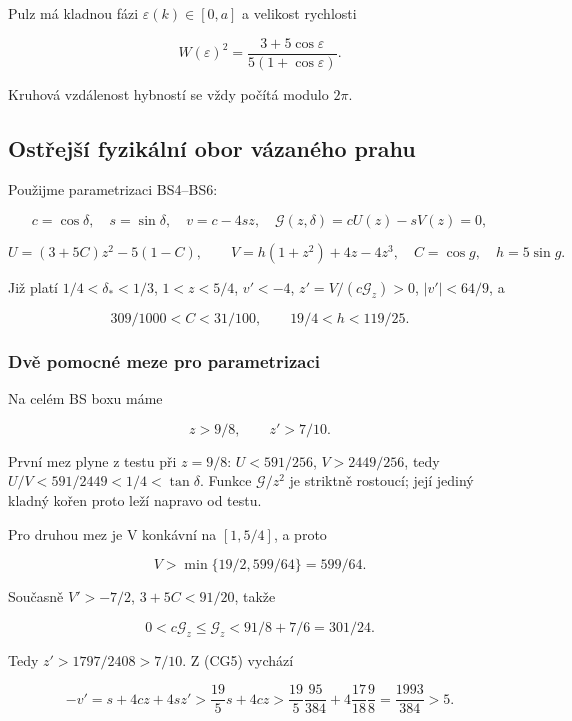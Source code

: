 \documentclass[11pt,a4paper]{article}
\theoremstyle{remark}\newtheorem{remark}[theorem]{Poznámka}
\numberwithin{equation}{section}
\begin{document}
Pulz má kladnou fázi \(\varepsilon(k)\in[0,a]\) a velikost rychlosti

\[
W(\varepsilon)^2=
\frac{3+5\cos\varepsilon}{5(1+\cos\varepsilon)}.
\tag{CG2}
\]

Kruhová vzdálenost hybností se vždy počítá modulo \(2\pi\).

\hypertarget{ostux159ejux161uxed-fyzikuxe1lnuxed-obor-vuxe1zanuxe9ho-prahu}{%
\subsection{Ostřejší fyzikální obor vázaného
prahu}\label{ostux159ejux161uxed-fyzikuxe1lnuxed-obor-vuxe1zanuxe9ho-prahu}}

Použijme parametrizaci BS4--BS6:

\[
c=\cos\delta,\quad s=\sin\delta,\quad
v=c-4sz,\quad \mathscr G(z,\delta)=cU(z)-sV(z)=0,
\]

\[
U=(3+5C)z^2-5(1-C),\qquad
V=h(1+z^2)+4z-4z^3,
\quad C=\cos g,\quad h=5\sin g.
\tag{CG3}
\]

Již platí \(1/4<\delta_*<1/3\), \(1<z<5/4\), \(v'<-4\),
\(z'=V/(c\mathscr G_z)>0\), \(|v'|<64/9\), a

\[
309/1000<C<31/100,\qquad 19/4<h<119/25.
\tag{CG4}
\]

\hypertarget{dvux11b-pomocnuxe9-meze-pro-parametrizaci}{%
\subsubsection{Dvě pomocné meze pro
parametrizaci}\label{dvux11b-pomocnuxe9-meze-pro-parametrizaci}}

Na celém BS boxu máme

\[
z>9/8,\qquad z'>7/10.
\tag{CG5}
\]

První mez plyne z testu při \(z=9/8\): \(U<591/256\), \(V>2449/256\),
tedy \(U/V<591/2449<1/4<\tan\delta\). Funkce \(\mathscr G/z^2\) je
striktně rostoucí; její jediný kladný kořen proto leží napravo od testu.

Pro druhou mez je V konkávní na \([1,5/4]\), a proto

\[
V>\min\{19/2,599/64\}=599/64.
\]

Současně \(V'>-7/2\), \(3+5C<91/20\), takže

\[
0<c\mathscr G_z\le\mathscr G_z
<91/8+7/6=301/24.
\]

Tedy \(z'>1797/2408>7/10\). Z (CG5) vychází

\[
-v'=s+4cz+4sz'
>\frac{19}{5}s+4cz
>\frac{19}{5}\frac{95}{384}
  +4\frac{17}{18}\frac98
=\frac{1993}{384}>5.
\tag{CG6}
\]
\end{document}
